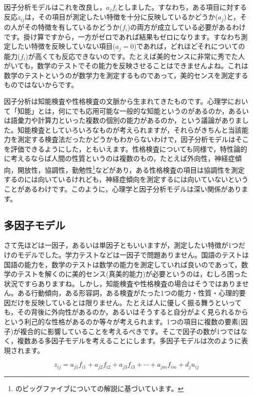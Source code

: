 \documentclass{ltjsbook}
\begin{document}
因子分析モデルはこれを改良し，$a_j f_i$としました。すなわち，ある項目に対する反応$z_{ij}$は，その項目が測定したい特徴を十分に反映しているかどうか($a_j$)と，その人がその特徴を有しているかどうか($f_i$)の両方が成立している必要があるわけです。掛け算ですから，一方がゼロであれば結果もゼロになります。すなわち測定したい特徴を反映していない項目($a_j=0$)であれば，どれほどそれについての能力($f_i$)が高くても反応できないのです。たとえば美的センスに非常に秀でた人がいても，数学のテストでその能力を反映させることはできませんよね。これは数学のテストというのが数学力を測定するものであって，美的センスを測定するものではないからです。

因子分析は知能検査や性格検査の文脈から生まれてきたものです。心理学において「知能」とは，何にでも応用可能な一般的な知能というのがあるのか，あるいは語彙力や計算力といった複数の個別の能力があるのか，という議論がありました。知能検査としていろいろなものが考えられますが，それらがきちんと当該能力を測定する検査法だったかどうかもわからないわけで，因子分析モデルはそこを評価できるようにした，ともいえます。性格検査についても同様で，特性論的に考えるならば人間の性質というのは複数のもの，たとえば外向性，神経症傾向，開放性，協調性，勤勉性\footnote{\citet{Oshio2020}のビッグファイブについての解説に基づいています。}などがあり，ある性格検査の項目は協調性を測定するのには向いているけれども，神経症傾向を測定するには向いていないということがあるわけです。このように，心理学と因子分析モデルは深い関係があります。

\subsection{多因子モデル}
さて先ほどは一因子，あるいは単因子ともいいますが，測定したい特徴が1つだけのモデルでした。学力テストなどは一因子で問題ありません。国語のテストは国語の能力を，数学のテストは数学の能力を測定していれば良いのであって，数学のテストを解くのに美的センス(真美的能力)が必要というのは，むしろ困った状況ですらありますね。しかし，知能検査や性格検査の場合はそうではありません。ある行動傾向，ある形容詞，ある検査がたった1つの能力・性質・心理的要因だけを反映しているとは限りません。たとえば人に優しく振る舞うといっても，その背後に外向性があるのか，あるいはそうすると自分がよく見られるからという利己的な性格があるのか等々が考えられます。1つの項目に複数の要素(因子)が複合的に影響していることを考えるべきです。そこで因子の数が1つではなく，複数ある多因子モデルを考えることにします。多因子モデルは次のように表現されます。

\begin{equation}
    z_{ij} = a_{j1}f_{i1} + a_{j2}f_{i2}+a_{j3}f_{i3} + \cdots + a_{jm}f_{im} + d_j u_{ij}
    \label{factor}
\end{equation}
\end{document}
